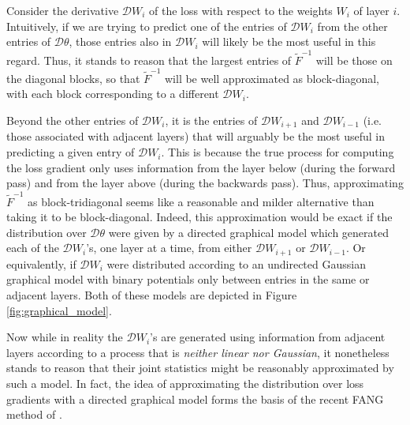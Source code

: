 \documentclass[12pt]{article}
\newcommand{\deriv}{\mathcal{D}}
\begin{document}
Consider the derivative $\deriv W_i$ of the loss with respect to the weights $W_i$ of layer $i$.   Intuitively, if we are trying to predict one of the entries of $\deriv W_i$ from the other entries of $\deriv \theta$, those entries also in $\deriv W_i$ will likely be the most useful in this regard.  Thus, it stands to reason that the largest entries of $\tilde{F}^{-1}$ will be those on the diagonal blocks, so that $\tilde{F}^{-1}$ will be well approximated as block-diagonal, with each block corresponding to a different $\deriv W_i$.

Beyond the other entries of $\deriv W_i$, it is the entries of $\deriv W_{i+1}$ and $\deriv W_{i-1}$ (i.e. those associated with adjacent layers) that will arguably be the most useful in predicting a given entry of $\deriv W_i$.   This is because the true process for computing the loss gradient only uses information from the layer below (during the forward pass) and from the layer above (during the backwards pass).  Thus, approximating $\tilde{F}^{-1}$ as block-tridiagonal seems like a reasonable and milder alternative than taking it to be block-diagonal.  Indeed, this approximation would be exact if the distribution over $\deriv \theta$ were given by a directed graphical model which generated each of the $\deriv W_i$'s, one layer at a time, from either $\deriv W_{i+1}$ or $\deriv W_{i-1}$. Or equivalently, if $\deriv W_i$ were distributed according to an undirected Gaussian graphical model with binary potentials only between entries in the same or adjacent layers.  Both of these models are depicted in Figure \ref{fig:graphical_model}.  

Now while in reality the $\deriv W_i$'s are generated using information from adjacent layers according to a process that is \emph{neither linear nor Gaussian}, it nonetheless stands to reason that their joint statistics might be reasonably approximated by such a model.  In fact, the idea of approximating the distribution over loss gradients with a directed graphical model forms the basis of the recent FANG method of \citet{FANG}.
\end{document}
